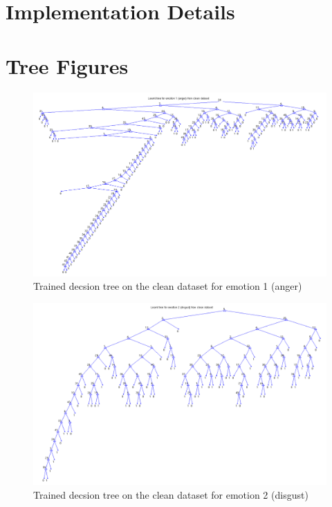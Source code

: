 \documentclass[a4paper]{article}
\begin{document}

\section{Implementation Details}

\clearpage


\section{Tree Figures}

\begin{figure}[!ht]
\center
\includegraphics[width=0.75\columnwidth]{AngerTree} %
\caption{Trained decsion tree on the clean dataset for emotion 1 (anger)}
\end{figure}

\bigskip\bigskip\bigskip\bigskip\bigskip\bigskip\bigskip

\begin{figure}[!ht]
\center
\includegraphics[width=0.75\columnwidth]{DisgustTree} %
\caption{Trained decsion tree on the clean dataset for emotion 2 (disgust)}
\end{figure}
\end{document}
